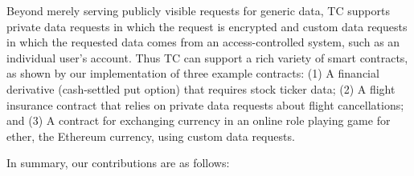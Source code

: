 Beyond merely serving publicly visible requests for generic data, TC supports private data requests in which the request is encrypted and custom data requests in which the requested data comes from an access-controlled system, such as an individual user's account. Thus TC can support a rich variety of smart contracts, as shown by our implementation of three example contracts: (1) A financial derivative (cash-settled put option) that requires stock ticker data; (2) A flight insurance contract that relies on private data requests about flight cancellations; and (3) A contract for exchanging currency in an online role playing game for ether, the Ethereum currency, using custom data requests.

In summary, our contributions are as follows:


